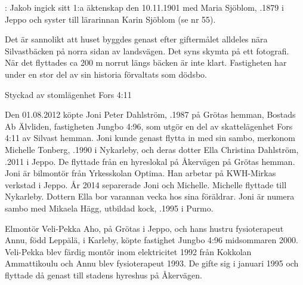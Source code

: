 :
Jakob ingick sitt 1:a äktenskap den 10.11.1901 med Maria Sjöblom, .1879 i Jeppo och syster till lärarinnan Karin Sjöblom (se nr 55).
\begin{jhchildren}
  \item {}
  \item {}
  \item {}
  \item {}
  \item {}
\end{jhchildren}
Det är sannolikt att huset byggdes genast efter giftermålet alldeles nära Silvastbäcken på norra sidan av landsvägen. Det syns skymta på ett fotografi. När det flyttades ca 200 m norrut längs bäcken är inte klart. Fastigheten har under en stor del av sin historia förvaltats som dödsbo.




Styckad av stomlägenhet Fors 4:11


Den 01.08.2012 köpte Joni Peter Dahlström, .1987 på Grötas hemman, Bostads Ab Älvliden, fastigheten Jungbo 4:96, som	utgör en del av skattelägenhet Fors 4:11 av Silvast hemman. Joni kunde	genast flytta in med sin sambo, merkonom Michelle Tonberg, .1990 i Nykarleby, och deras dotter Ella Christina Dahlström, .2011 i Jeppo. De flyttade från en hyreslokal på Åkervägen på 	Grötas hemman. Joni är bilmontör från Yrkesskolan Optima. Han arbetar på KWH-Mirkas verkstad i Jeppo. År 2014 separerade Joni och Michelle. Michelle flyttade till Nykarleby. Dottern Ella bor varannan vecka hos sina föräldrar. Joni är numera sambo med Mikaela Hägg, utbildad kock, 	.1995 i Purmo.


Elmontör Veli-Pekka Aho,  på Grötas i Jeppo, och hans hustru fysioterapeut Annu, född Leppälä,  i Karleby, köpte fastighet Jungbo 4:96 midsommaren 2000. Veli-Pekka blev färdig montör inom elektricitet 1992 från Kokkolan Ammattikoulu och Annu blev fysioterapeut 1993. De gifte sig i januari 1995 och flyttade då genast till stadens hyreshus på Åkervägen.

